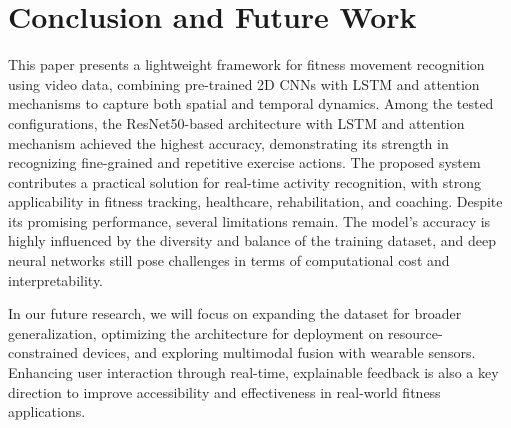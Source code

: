 \documentclass[conference]{IEEEtran}
\begin{document}
\section{Conclusion and Future Work}

This paper presents a lightweight framework for fitness movement recognition using video data, combining pre-trained 2D CNNs with LSTM and attention mechanisms to capture both spatial and temporal dynamics. Among the tested configurations, the ResNet50-based architecture with LSTM and attention mechanism achieved the highest accuracy, demonstrating its strength in recognizing fine-grained and repetitive exercise actions. The proposed system contributes a practical solution for real-time activity recognition, with strong applicability in fitness tracking, healthcare, rehabilitation, and coaching. Despite its promising performance, several limitations remain. The model’s accuracy is highly influenced by the diversity and balance of the training dataset, and deep neural networks still pose challenges in terms of computational cost and interpretability.

In our future research, we will focus on expanding the dataset for broader generalization, optimizing the architecture for deployment on resource-constrained devices, and exploring multimodal fusion with wearable sensors. Enhancing user interaction through real-time, explainable feedback is also a key direction to improve accessibility and effectiveness in real-world fitness applications.



\end{document}
